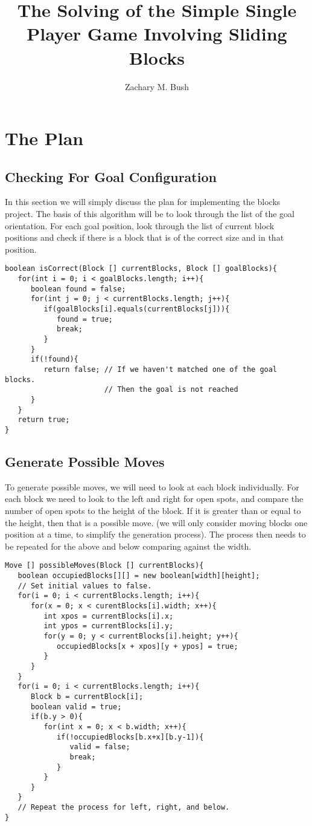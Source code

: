 \documentclass[a4paper]{article}
\begin{document}
\title{The Solving of the Simple Single Player Game Involving Sliding
Blocks}
\author{Zachary M. Bush}
\maketitle
\tableofcontents
\lstlistoflistings
\newpage
\section{The Plan}
\subsection{Checking For Goal Configuration}
In this section we will simply discuss the plan for implementing the blocks 
project. The basis of this algorithm will be to look through the list of the 
goal orientation. For each goal position, look through the list of current 
block positions and check if there is a block that is of the correct size and 
in that position. 
\begin{lstlisting}[caption=Checking for Goal Configuration]
boolean isCorrect(Block [] currentBlocks, Block [] goalBlocks){
   for(int i = 0; i < goalBlocks.length; i++){
      boolean found = false;
      for(int j = 0; j < currentBlocks.length; j++){
         if(goalBlocks[i].equals(currentBlocks[j])){
            found = true;
            break;
         }
      }
      if(!found){
         return false; // If we haven't matched one of the goal blocks. 
                       // Then the goal is not reached
      }
   }
   return true;
}
\end{lstlisting}
\subsection{Generate Possible Moves}
To generate possible moves, we will need to look at each block individually. 
For each block we need to look to the left and right for open spots, and 
compare the number of open spots to the height of the block. If it is greater 
than or equal to the height, then that is a possible move. (we will only 
consider moving blocks one position at a time, to simplify the generation 
process). The process then needs to be repeated for the above and below 
comparing against the width. 
\begin{lstlisting}[caption=Generate Possible Moves]
Move [] possibleMoves(Block [] currentBlocks){
   boolean occupiedBlocks[][] = new boolean[width][height];
   // Set initial values to false.
   for(i = 0; i < currentBlocks.length; i++){
      for(x = 0; x < curentBlocks[i].width; x++){
         int xpos = currentBlocks[i].x;
         int ypos = currentBlocks[i].y;
         for(y = 0; y < currentBlocks[i].height; y++){
            occupiedBlocks[x + xpos][y + ypos] = true;
         }
      }
   }
   for(i = 0; i < currentBlocks.length; i++){
      Block b = currentBlock[i];
      boolean valid = true;
      if(b.y > 0){
         for(int x = 0; x < b.width; x++){
            if(!occupiedBlocks[b.x+x][b.y-1]){
               valid = false;
               break;
            }
         }
      }
   }
   // Repeat the process for left, right, and below. 
}
\end{lstlisting}
\end{document}
